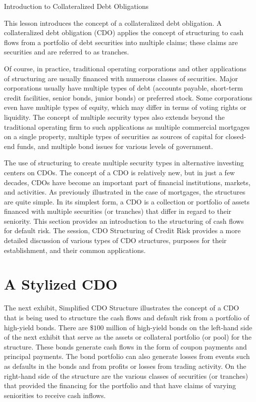 \documentclass[11pt]{article}
\begin{document}
Introduction to Collateralized Debt Obligations

This lesson introduces the concept of a collateralized debt obligation. A collateralized debt obligation (CDO) applies the concept of structuring to cash flows from a portfolio of debt securities into multiple claims; these claims are securities and are referred to as tranches.

Of course, in practice, traditional operating corporations and other applications of structuring are usually financed with numerous classes of securities. Major corporations usually have multiple types of debt (accounts payable, short-term credit facilities, senior bonds, junior bonds) or preferred stock. Some corporations even have multiple types of equity, which may differ in terms of voting rights or liquidity. The concept of multiple security types also extends beyond the traditional operating firm to such applications as multiple commercial mortgages on a single property, multiple types of securities as sources of capital for closed-end funds, and multiple bond issues for various levels of government.

The use of structuring to create multiple security types in alternative investing centers on CDOs. The concept of a CDO is relatively new, but in just a few decades, CDOs have become an important part of financial institutions, markets, and activities. As previously illustrated in the case of mortgages, the structures are quite simple. In its simplest form, a CDO is a collection or portfolio of assets financed with multiple securities (or tranches) that differ in regard to their seniority. This section provides an introduction to the structuring of cash flows for default risk. The session, CDO Structuring of Credit Risk provides a more detailed discussion of various types of CDO structures, purposes for their establishment, and their common applications.

\section*{A Stylized CDO}
The next exhibit, Simplified CDO Structure illustrates the concept of a CDO that is being used to structure the cash flows and default risk from a portfolio of high-yield bonds. There are $\$ 100$ million of high-yield bonds on the left-hand side of the next exhibit that serve as the assets or collateral portfolio (or pool) for the structure. These bonds generate cash flows in the form of coupon payments and principal payments. The bond portfolio can also generate losses from events such as defaults in the bonds and from profits or losses from trading activity. On the right-hand side of the structure are the various classes of securities (or tranches) that provided the financing for the portfolio and that have claims of varying seniorities to receive cash inflows.
\end{document}
